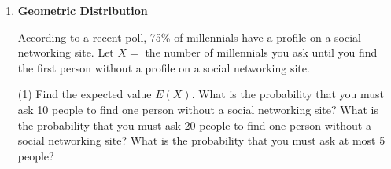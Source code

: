 \begin{enumerate}
\vspace{20pt}

\item \textbf{Geometric Distribution}

According to a recent poll, 75\% of millennials have a profile on a social networking site. Let $X =$ the number of millennials you ask until you find the first person without a profile on a social networking site.
\begin{tasks}[after-skip = 20pt, after-item-skip=15pt](1)
\task Find the expected value $E(X)$.
\task What is the probability that you must ask 10 people to find one person without a social networking site?
\task What is the probability that you must ask 20 people to find one person without a social networking site?
\task What is the probability that you must ask at most 5 people?
\end{tasks}
\end{enumerate}